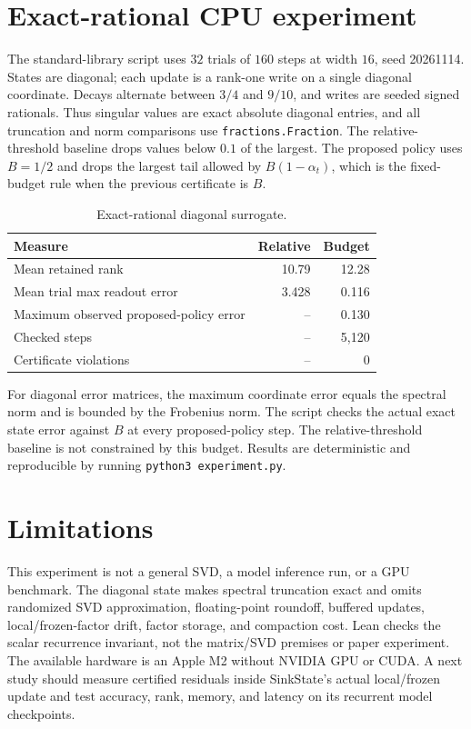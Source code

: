 \documentclass[11pt]{article}
\begin{document}
\section{Exact-rational CPU experiment}
The standard-library script uses $32$ trials of $160$ steps at width $16$, seed 20261114. States are diagonal; each update is a rank-one write on a single diagonal coordinate. Decays alternate between $3/4$ and $9/10$, and writes are seeded signed rationals. Thus singular values are exact absolute diagonal entries, and all truncation and norm comparisons use \texttt{fractions.Fraction}. The relative-threshold baseline drops values below $0.1$ of the largest. The proposed policy uses $B=1/2$ and drops the largest tail allowed by $B(1-\alpha_t)$, which is the fixed-budget rule when the previous certificate is $B$.

\begin{table}[t]
\centering\small
\begin{tabular}{p{4.0cm}rr}\toprule
Measure & Relative & Budget \\\midrule
Mean retained rank & 10.79 & 12.28 \\
Mean trial max readout error & 3.428 & 0.116 \\
Maximum observed proposed-policy error & -- & 0.130 \\
Checked steps & -- & 5,120 \\
Certificate violations & -- & 0 \\\bottomrule
\end{tabular}
\caption{Exact-rational diagonal surrogate.}
\label{tab:results}
\end{table}

For diagonal error matrices, the maximum coordinate error equals the spectral norm and is bounded by the Frobenius norm. The script checks the actual exact state error against $B$ at every proposed-policy step. The relative-threshold baseline is not constrained by this budget. Results are deterministic and reproducible by running \texttt{python3 experiment.py}.

\section{Limitations}
This experiment is not a general SVD, a model inference run, or a GPU benchmark. The diagonal state makes spectral truncation exact and omits randomized SVD approximation, floating-point roundoff, buffered updates, local/frozen-factor drift, factor storage, and compaction cost. Lean checks the scalar recurrence invariant, not the matrix/SVD premises or paper experiment. The available hardware is an Apple M2 without NVIDIA GPU or CUDA. A next study should measure certified residuals inside SinkState's actual local/frozen update and test accuracy, rank, memory, and latency on its recurrent model checkpoints.
\end{document}

